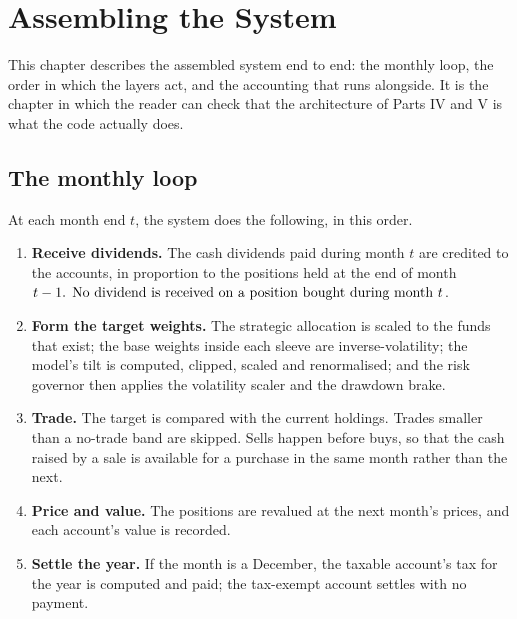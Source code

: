 
\chapter{Assembling the System}
\label{ch:assembled}

This chapter describes the assembled system end to end: the monthly loop,
the order in which the layers act, and the accounting that runs alongside.
It is the chapter in which the reader can check that the architecture of
Parts IV and V is what the code actually does.

\section{The monthly loop}

At each month end \(t\), the system does the following, in this order.

\begin{enumerate}
\item \textbf{Receive dividends.} The cash dividends paid during month
\(t\) are credited to the accounts, in proportion to the positions held at
the end of month \(t-1$. No dividend is received on a position bought
during month \(t\).
\item \textbf{Form the target weights.} The strategic allocation is scaled
to the funds that exist; the base weights inside each sleeve are
inverse-volatility; the model's tilt is computed, clipped, scaled and
renormalised; and the risk governor then applies the volatility scaler
and the drawdown brake.
\item \textbf{Trade.} The target is compared with the current holdings.
Trades smaller than a no-trade band are skipped. Sells happen before
buys, so that the cash raised by a sale is available for a purchase in the
same month rather than the next.
\item \textbf{Price and value.} The positions are revalued at the next
month's prices, and each account's value is recorded.
\item \textbf{Settle the year.} If the month is a December, the taxable
account's tax for the year is computed and paid; the tax-exempt account
settles with no payment.
\end{enumerate}

